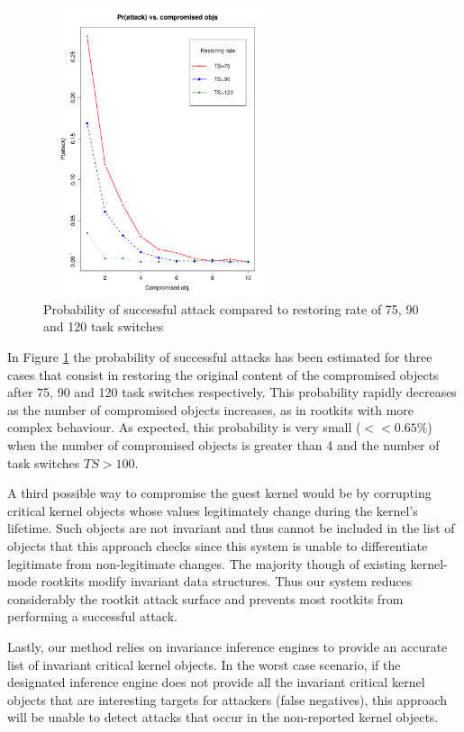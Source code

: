 \begin{figure}[!htbp]
\begin{center}
\includegraphics[width=70mm, height=85mm]{images/hr_sim_1000_ts}
\caption{{Probability of successful attack compared to restoring rate of 75, 90 and 120 task switches}}
\label{probts}
\end{center}
\end{figure}

In Figure \ref{probts} the probability of successful attacks has been estimated for three cases that consist in restoring the original content of the compromised objects after 75, 90 and 120 task switches respectively. This probability rapidly decreases as the number of compromised objects increases, as in rootkits with more complex behaviour. 
As expected, this probability is very small ($<< 0.65\%$) when the number of compromised objects is greater than 4 and the number of task switches $TS>100$.

A third possible way to compromise the guest kernel would be by corrupting critical kernel objects whose values legitimately change during the kernel's lifetime. Such objects are not invariant and thus cannot  be included in the list of objects that this approach checks since this system is unable to differentiate legitimate from non-legitimate changes. The majority though of existing kernel-mode rootkits modify invariant data structures. Thus our system reduces considerably the rootkit attack surface and prevents most rootkits from performing a successful attack.

Lastly, our method relies on invariance inference engines to provide an accurate list of invariant critical kernel objects. In the worst case scenario, if the designated inference engine does not provide all the invariant critical kernel objects that are interesting targets for attackers (false negatives), this approach will be unable to detect attacks that occur in the non-reported kernel objects.



